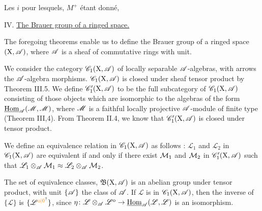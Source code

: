 Les $i$ pour lesquels, $M^+$ étant donné,
\begin{center}
IV. \uline{The Brauer group of a ringed space.}
\end{center}

The foregoing theorems enable us to define the Brauer group of a ringed space $(\mathrm{X},\mathscr{A})$, where $\mathscr{A}$ is a sheaf of commutative rings with unit.

We consider the category $\mathscr{C}_1(\mathrm{X},\mathscr{A})$ of locally separable $\mathscr{A}$-algebras, with arrows the $\mathscr{A}$-algebra morphisms. $\mathscr{C}_1(\mathrm{X},\mathscr{A})$ is closed under sheaf tensor product by Theorem III.5. We define $\mathscr{C}'_1(\mathrm{X},\mathscr{A})$ to be the full subcategory of $\mathscr{C}_1(\mathrm{X},\mathscr{A})$ consisting of those objects which are isomorphic to the algebras of the form $\underline{\mathrm{Hom}}_{\mathscr{A}}(\mathscr{M},\mathscr{M})$, where $\mathscr{M}$ is a faithful locally projective $\mathscr{A}$-module of finite type (Theorem III,4). From Theorem II.4, we know that $\mathscr{C}'_1(\mathrm{X},\mathscr{A})$ is closed under tensor product.

We define an equivalence relation in $\mathscr{C}_1(\mathrm{X},\mathscr{A})$ as follows : $\mathscr{L}_1$ and $\mathscr{L}_2$ in $\mathscr{C}_1(\mathrm{X},\mathscr{A})$ are equivalent if and only if there exist $\mathcal{M}_1$ and $\mathcal{M}_2$ in $\mathscr{C}'_1(\mathrm{X},\mathscr{A})$ such that $\mathscr{L}_1\otimes_{\mathscr{A}}\mathcal{M}_1\approx \mathscr{L}_2\otimes_{\mathscr{A}}\mathcal{M}_2$.

The set of equivalence classes, $\mathfrak{B}(\mathrm X,\mathscr{A})$ is an abelian group under tensor product, with unit $\{\mathscr{A}\}$ the class of $\mathscr{A}$. If $\mathscr{L}$ is in $\mathscr{C}_1(\mathrm{X},\mathscr{A})$, then the inverse of $\{\mathscr{L}\}$ is $\{\mathscr{L}^{\unsure{\mathrm{o}|0}}\}$, since $\eta\colon \mathscr{L}\otimes_{\mathscr{A}}\mathscr{L}^{\mathrm{o}}\to \underline{\mathrm{Hom}}_{\mathscr{A}}(\mathscr{L},\mathscr{L})$ is an isomorphism.


